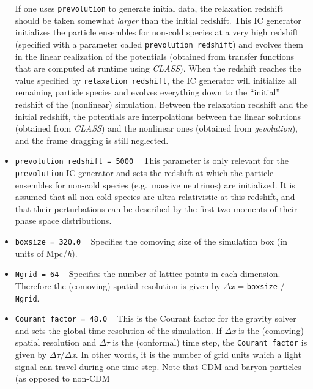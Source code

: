 \documentclass[a4paper,10pt]{article}
\begin{document}
\begin{itemize}
If one uses \texttt{prevolution} to generate initial data, the relaxation redshift should be taken somewhat \textit{larger} than the initial
redshift. This IC generator initializes the particle ensembles for non-cold species at a very high redshift (specified with a parameter
called \texttt{prevolution redshift}) and evolves them in the linear realization of the potentials (obtained from transfer functions
that are computed at runtime using \textit{CLASS}). When the redshift reaches the value specified by \texttt{relaxation redshift}, the
IC generator will initialize all remaining particle species and evolves everything down to the ``initial'' redshift of the (nonlinear)
simulation. Between the relaxation redshift and the initial redshift, the potentials are interpolations between the linear solutions
(obtained from
\textit{CLASS}) and the nonlinear ones (obtained from \textit{gevolution}), and the frame dragging is still neglected.
 \item[] \hspace{-25pt}\texttt{prevolution redshift = 5000} ~ This parameter is only relevant for the \texttt{prevolution} IC generator and
 sets the redshift at which the particle ensembles for non-cold species (e.g.\ massive neutrinos) are initialized. It is assumed that all
 non-cold species are ultra-relativistic at this redshift, and that their perturbations can be described by the first two moments of their
 phase space distributions.
 \item[] \hspace{-25pt}\texttt{boxsize = 320.0} ~ Specifies the comoving size of the simulation box (in units of Mpc/\textit{h}).
 \item[] \hspace{-25pt}\texttt{Ngrid = 64} ~ Specifies the number of lattice points in each dimension. Therefore the (comoving) spatial 
 resolution is given by  $\mathsf{\Delta}$\textit{x} = \texttt{boxsize} / \texttt{Ngrid}.
 \item[] \hspace{-25pt}\texttt{Courant factor = 48.0} ~ This is the Courant factor for the gravity solver and sets the global time
 resolution of the simulation. If $\mathsf{\Delta}$\textit{x} is the (comoving) spatial resolution and $\mathsf{\Delta\tau}$ is the
 (conformal) time step, the \texttt{Courant factor} is given by $\mathsf{\Delta\tau} / \mathsf{\Delta}$\textit{x}. In other words, it is the
 number of grid units which a light signal can travel during one time step. Note that CDM and baryon particles (as opposed to non-CDM

\end{itemize}
\end{document}
